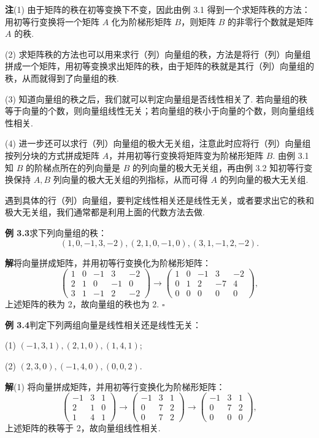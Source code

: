 \documentclass[UTF8,12pt,a4paper,fontset=fandol]{ctexart}
\begin{document}
\noindent\textbf{注}\quad (1) 由于矩阵的秩在初等变换下不变，因此由例 3.1 得到一个求矩阵秩的方法：用初等行变换将一个矩阵 $A$ 化为阶梯形矩阵 $B$，则矩阵 $B$ 的非零行个数就是矩阵 $A$ 的秩.

(2) 求矩阵秩的方法也可以用来求行（列）向量组的秩，方法是将行（列）向量组拼成一个矩阵，用初等变换求出矩阵的秩，由于矩阵的秩就是其行（列）向量组的秩，从而就得到了向量组的秩.

(3) 知道向量组的秩之后，我们就可以判定向量组是否线性相关了. 若向量组的秩等于向量的个数，则向量组线性无关；若向量组的秩小于向量的个数，则向量组线性相关.

(4) 进一步还可以求行（列）向量组的极大无关组，注意此时应将行（列）向量组按列分块的方式拼成矩阵 $A$，并用初等行变换将矩阵变为阶梯形矩阵 $B$. 由例 3.1 知 $B$ 的阶梯点所在的列向量是 $B$ 的列向量的极大无关组，再由例 3.2 知初等行变换保持 $A,B$ 列向量的极大无关组的列指标，从而可得 $A$ 的列向量的极大无关组.

遇到具体的行（列）向量组，要判定线性相关还是线性无关，或者要求出它的秩和极大无关组，我们通常都是利用上面的代数方法去做.

\noindent\textbf{例 3.3}\quad 求下列向量组的秩：
\[
(1,0,-1,3,-2),(2,1,0,-1,0),(3,1,-1,2,-2).
\]

\noindent\textbf{解}\quad 将向量拼成矩阵，并用初等行变换化为阶梯形矩阵：
\[
\begin{pmatrix}
1 & 0 & -1 & 3 & -2\\
2 & 1 & 0 & -1 & 0\\
3 & 1 & -1 & 2 & -2
\end{pmatrix}
\to
\begin{pmatrix}
1 & 0 & -1 & 3 & -2\\
0 & 1 & 2 & -7 & 4\\
0 & 0 & 0 & 0 & 0
\end{pmatrix},
\]
上述矩阵的秩为 2，故向量组的秩也为 2. $\square$

\noindent\textbf{例 3.4}\quad 判定下列两组向量是线性相关还是线性无关：

(1) $(-1,3,1),(2,1,0),(1,4,1)$;

(2) $(2,3,0),(-1,4,0),(0,0,2)$.

\noindent\textbf{解}\quad (1) 将向量拼成矩阵，并用初等行变换化为阶梯形矩阵：
\[
\begin{pmatrix}
-1 & 3 & 1\\
2 & 1 & 0\\
1 & 4 & 1
\end{pmatrix}
\to
\begin{pmatrix}
-1 & 3 & 1\\
0 & 7 & 2\\
0 & 7 & 2
\end{pmatrix}
\to
\begin{pmatrix}
-1 & 3 & 1\\
0 & 7 & 2\\
0 & 0 & 0
\end{pmatrix},
\]
上述矩阵的秩等于 2，故向量组线性相关.
\end{document}
